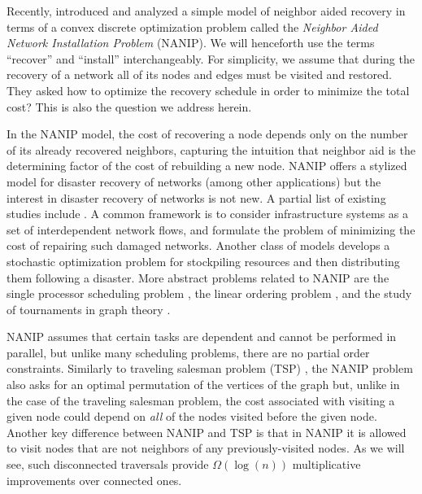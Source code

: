 \documentclass[english]{llncs}
\begin{document}
Recently, \cite{Gutfraind14} introduced and analyzed a simple
model of neighbor aided recovery in terms of a convex discrete optimization
problem called the \emph{Neighbor Aided Network Installation Problem} (NANIP).
We will henceforth use the terms ``recover'' and ``install'' interchangeably.
For simplicity, we assume that during the recovery of a network all of its
nodes and edges must be visited and restored. They asked how to optimize the
recovery schedule in order to minimize the total cost?  This is also the
question we address herein.

In the NANIP model, the cost of recovering a node depends only on the number of
its already recovered neighbors, capturing the intuition that neighbor aid is
the determining factor of the cost of rebuilding a new node.  NANIP offers a
stylized model for disaster recovery of networks (among other applications) but
the interest in disaster recovery of networks is not new.  A partial list of
existing studies include
\cite{Guha99,nurre2010restoring,Lee07,Adibi94,Bertoli02,coffrin2011strategic}.
A common framework is to consider infrastructure systems as a set of
interdependent network flows, and formulate the problem of minimizing the cost
of repairing such damaged networks.  Another class of models
\cite{Hentenryck10} develops a stochastic optimization problem for stockpiling
resources and then distributing them following a disaster.  More abstract
problems related to NANIP are the single processor scheduling problem
\cite{Karp61}, the linear ordering problem \cite{Mitchell96}, and the study of
tournaments in graph theory \cite{West01}.  

NANIP assumes that certain tasks are dependent and cannot be performed in
parallel, but unlike many scheduling problems, there are no partial order
constraints.  Similarly to traveling salesman problem (TSP)
\cite{schrijver2005history}, the NANIP problem also asks for an optimal
permutation of the vertices of the graph but, unlike in the case of the
traveling salesman problem, the cost associated with visiting a given node
could depend on \emph{all} of the nodes visited before the given node. Another
key difference between NANIP and TSP is that in NANIP it is allowed to visit
nodes that are not neighbors of any previously-visited nodes. As we will see,
such disconnected traversals provide $\Omega(\log(n))$ multiplicative
improvements over connected ones.
\end{document}
